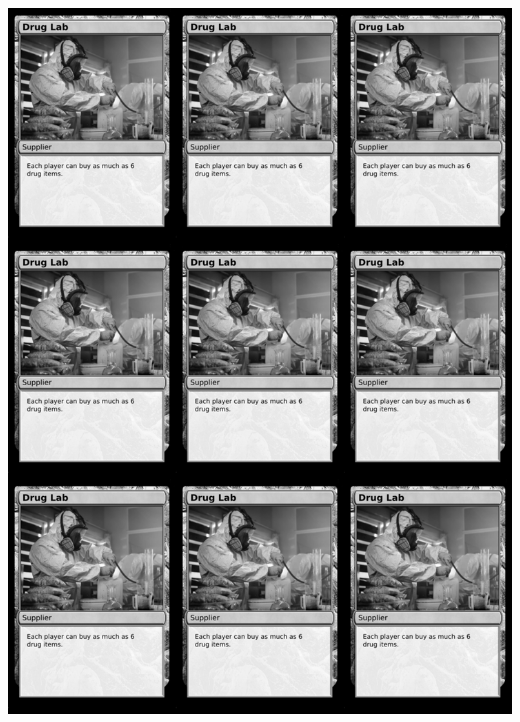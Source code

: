 \documentclass[a4paper]{article}
\begin{document}
\begin{center}
	\centering
	\includegraphics[width=190.5mm,height=266.7mm]{output/temp/page20.png}
\end{center}

\newpage
\end{document}

